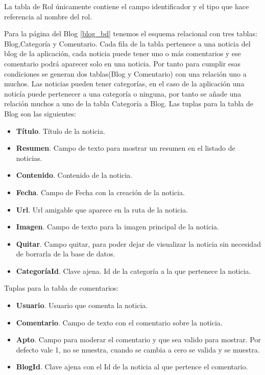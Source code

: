 \vspace{5 mm}

La tabla de Rol únicamente contiene el campo identificador y el tipo que hace referencia al nombre del rol.

\vspace{5 mm}

Para la página del Blog \ref{blog_bd} tenemos el esquema relacional con tres tablas: Blog,Categoría y Comentario. Cada fila de la tabla pertenece a una noticia del blog de la aplicación, cada noticia puede tener uno o más comentarios y ese comentario podrá aparecer solo en una noticia. Por tanto para cumplir esas condiciones se generan dos tablas(Blog y Comentario) con una relación uno a muchos. Las noticias pueden tener categorías, en el caso de la aplicación una noticía puede pertenecer a una categoría o ninguna, por tanto se añade una relación muchos a uno de la tabla Categoría a Blog. Las tuplas para la tabla de Blog son las siguientes:


\begin{itemize}

\item \textbf{Título}. Título de la noticia.
\item \textbf{Resumen}. Campo de texto para mostrar un resumen en el listado de noticias.
\item \textbf{Contenido}. Contenido de la noticia.
\item \textbf{Fecha}. Campo de Fecha con la creación de la noticia.
\item \textbf{Url}. Url amigable que aparece en la ruta de la noticia.
\item \textbf{Imagen}. Campo de texto para la imagen principal de la noticia.
\item \textbf{Quitar}. Campo quitar, para poder dejar de visualizar la noticia sin necesidad de borrarla de la base de datos.
\item \textbf{CategoríaId}. Clave ajena. Id de la categoría a la que pertenece la noticia.

\end{itemize}

\vspace{5 mm}

Tuplas para la tabla de comentarios:

\begin{itemize}

\item \textbf{Usuario}. Usuario que comenta la noticia.
\item \textbf{Comentario}. Campo de texto con el comentario sobre la noticia.
\item \textbf{Apto}. Campo para moderar el comentario y que sea valido para mostrar. Por defecto vale 1, no se muestra, cuando se cambia a cero se valida y se muestra.
\item \textbf{BlogId}. Clave ajena con el Id de la noticia al que pertence el comentario.


\end{itemize}


